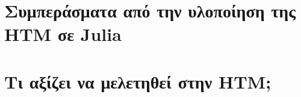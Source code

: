 \section{Συμπεράσματα από την υλοποίηση της HTM σε Julia}

\section{Τι αξίζει να μελετηθεί στην HTM;}
